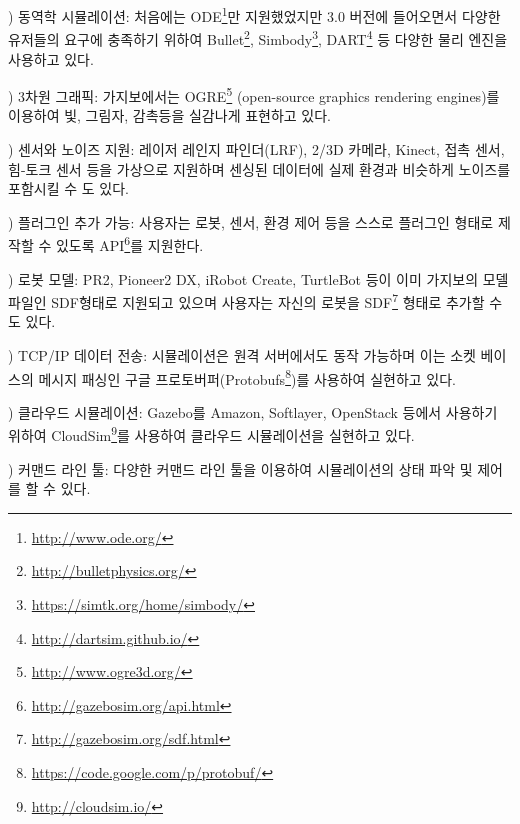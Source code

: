 \vspace{\baselineskip}
\noindent{}
\thenum) 동역학 시뮬레이션: 처음에는 ODE\footnote{\url{http://www.ode.org/}}만 지원했었지만 3.0 버전에 들어오면서 다양한 유저들의 요구에 충족하기 위하여 Bullet\footnote{\url{http://bulletphysics.org/}}, Simbody\footnote{\url{https://simtk.org/home/simbody/}}, DART\footnote{\url{http://dartsim.github.io/}} 등 다양한 물리 엔진을 사용하고 있다.

\vspace{\baselineskip}
\noindent{}
\thenum) 3차원 그래픽: 가지보에서는 OGRE\footnote{\url{http://www.ogre3d.org/}} (open-source graphics rendering engines)를 이용하여 빛, 그림자, 감촉등을 실감나게 표현하고 있다.

\vspace{\baselineskip}
\noindent{}
\thenum) 센서와 노이즈 지원: 레이저 레인지 파인더(LRF), 2/3D 카메라, Kinect, 접촉 센서, 힘-토크 센서 등을 가상으로 지원하며 센싱된 데이터에 실제 환경과 비슷하게 노이즈를 포함시킬 수 도 있다.

\vspace{\baselineskip}
\noindent{}
\thenum) 플러그인 추가 가능: 사용자는 로봇, 센서, 환경 제어 등을 스스로 플러그인 형태로 제작할 수 있도록 API\footnote{\url{http://gazebosim.org/api.html}}를 지원한다.

\vspace{\baselineskip}
\noindent{}
\thenum) 로봇 모델: PR2, Pioneer2 DX, iRobot Create, TurtleBot 등이 이미 가지보의 모델 파일인 SDF형태로 지원되고 있으며 사용자는 자신의 로봇을 SDF\footnote{\url{http://gazebosim.org/sdf.html}} 형태로 추가할 수도 있다.

\vspace{\baselineskip}
\noindent{}
\thenum) TCP/IP 데이터 전송: 시뮬레이션은 원격 서버에서도 동작 가능하며 이는 소켓 베이스의 메시지 패싱인 구글 프로토버퍼(Protobufs\footnote{\url{https://code.google.com/p/protobuf/}})를 사용하여 실현하고 있다.

\vspace{\baselineskip}
\noindent{}
\thenum) 클라우드 시뮬레이션: Gazebo를 Amazon, Softlayer, OpenStack 등에서 사용하기 위하여 CloudSim\footnote{\url{http://cloudsim.io/}}를 사용하여 클라우드 시뮬레이션을 실현하고 있다.

\vspace{\baselineskip}
\noindent{}
\thenum) 커맨드 라인 툴: 다양한 커맨드 라인 툴을 이용하여 시뮬레이션의 상태 파악 및 제어를 할 수 있다.


